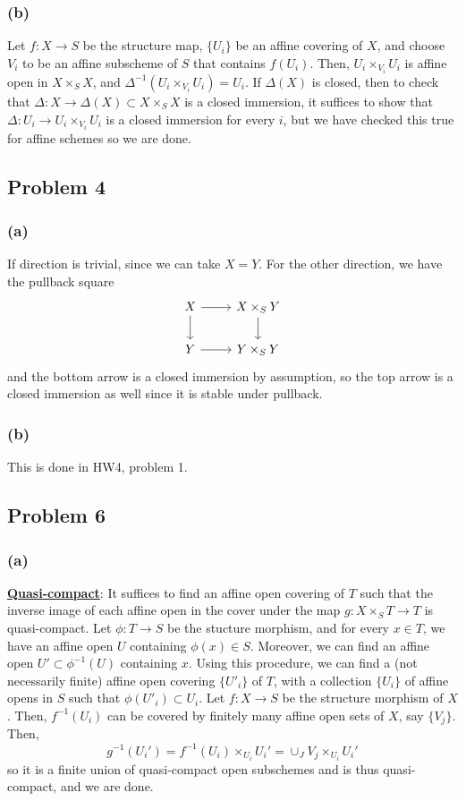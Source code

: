 \documentclass{article}
\theoremstyle{definition}
\theoremstyle{definition}
\theoremstyle{definition}
\theoremstyle{definition}
\theoremstyle{definition}
\theoremstyle{definition}
\theoremstyle{definition}
\begin{document}
\subsubsection*{(b)}
Let $f: X\to S$ be the structure map, $\{U_i\}$ be an affine covering of $X$, and choose $V_i$ to be an affine subscheme of $S$ that contains $f(U_i)$. Then, $U_i\times_{V_i}U_i$ is affine open in $X\times_S X$, and $\Delta^{-1}(U_i\times_{V_i}U_i)=U_i$. If $\Delta (X)$ is closed, then to check that $\Delta: X\to \Delta(X)\subset X\times_{S}X$ is a closed immersion, it suffices to show that $\Delta: U_i\to U_i\times_{V_i}U_i$ is a closed immersion for every $i$, but we have checked this true for affine schemes so we are done. 




\subsection*{Problem 4}
\subsubsection*{(a)}
If direction is trivial, since we can take $X=Y$. For the other direction, we have the pullback square
\[\begin{tikzcd}
X\arrow[d]\arrow[r]& X\times_S Y\arrow[d]\\
Y\arrow[r]&Y\times_S Y
\end{tikzcd}\]
and the bottom arrow is a closed immersion by assumption, so the top arrow is a closed immersion as well since it is stable under pullback.


\subsubsection*{(b)}
This is done in HW4, problem 1.



\subsection*{Problem 6}
\subsubsection*{(a)}
\underline{\textbf{Quasi-compact}}: It suffices to find an affine open covering of $T$ such that the inverse image of each affine open in the cover under the map $g:X\times_S T\to T$ is quasi-compact. Let $\phi: T\to S$ be the stucture morphism, and for every $x\in T$, we have an affine open $U$ containing $\phi(x)\in S$. Moreover, we can find an affine open $U'\subset \phi^{-1}(U)$ containing $x$. Using this procedure, we can find a (not necessarily finite) affine open covering $\{U'_i\}$ of $T$, with a collection $\{U_i\}$ of affine opens in $S$ such that $\phi(U'_i)\subset U_i$. Let $f:X\to S$ be the structure morphism of $X$. Then, $f^{-1}(U_i)$ can be covered by finitely many affine open sets of $X$, say $\{V_j\}$. Then, 
\[g^{-1}(U_i')=f^{-1}(U_i)\times_{U_i}U_i'=\cup_J V_j\times_{U_i} U_i' \]
so it is a finite union of quasi-compact open subschemes and is thus quasi-compact, and we are done. 
\end{document}
